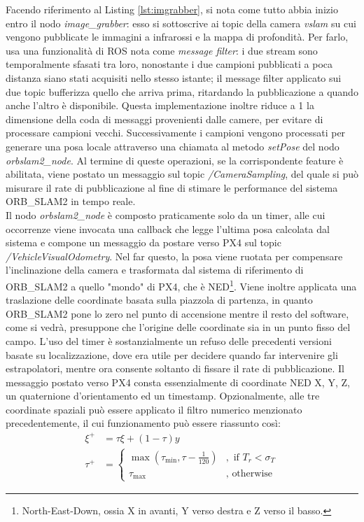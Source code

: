 Facendo riferimento al Listing \ref{lst:imgrabber}, si nota come tutto abbia inizio entro il nodo \emph{image\_grabber}: esso si sottoscrive ai topic della camera \emph{vslam} su cui vengono pubblicate le immagini a infrarossi e la mappa di profondità. Per farlo, usa una funzionalità di ROS nota come \emph{message filter}: i due stream sono temporalmente sfasati tra loro, nonostante i due campioni pubblicati a poca distanza siano stati acquisiti nello stesso istante; il message filter applicato sui due topic bufferizza quello che arriva prima, ritardando la pubblicazione a quando anche l'altro è disponibile. Questa implementazione inoltre riduce a 1 la dimensione della coda di messaggi provenienti dalle camere, per evitare di processare campioni vecchi. Successivamente i campioni vengono processati per generare una posa locale attraverso una chiamata al metodo \emph{setPose} del nodo \emph{orbslam2\_node}. Al termine di queste operazioni, se la corrispondente feature è abilitata, viene postato un messaggio sul topic \emph{/CameraSampling}, del quale si può misurare il rate di pubblicazione al fine di stimare le performance del sistema ORB\_SLAM2 in tempo reale.\\
Il nodo \emph{orbslam2\_node} è composto praticamente solo da un timer, alle cui occorrenze viene invocata una callback che legge l'ultima posa calcolata dal sistema e compone un messaggio da postare verso PX4 sul topic \emph{/VehicleVisualOdometry}. Nel far questo, la posa viene ruotata per compensare l'inclinazione della camera e trasformata dal sistema di riferimento di ORB\_SLAM2 a quello "mondo" di PX4, che è NED\footnote{North-East-Down, ossia X in avanti, Y verso destra e Z verso il basso.}. Viene inoltre applicata una traslazione delle coordinate basata sulla piazzola di partenza, in quanto ORB\_SLAM2 pone lo zero nel punto di accensione mentre il resto del software, come si vedrà, presuppone che l'origine delle coordinate sia in un punto fisso del campo. L'uso del timer è sostanzialmente un refuso delle precedenti versioni basate su localizzazione, dove era utile per decidere quando far intervenire gli estrapolatori, mentre ora consente soltanto di fissare il rate di pubblicazione. Il messaggio postato verso PX4 consta essenzialmente di coordinate NED X, Y, Z, un quaternione d'orientamento ed un timestamp. Opzionalmente, alle tre coordinate spaziali può essere applicato il filtro numerico menzionato precedentemente, il cui funzionamento può essere riassunto così:
\begin{subequations}
    \begin{align}
        \xi^+ &= \tau\xi + (1 - \tau)y\\
        \tau^+ &=
        \begin{cases}
            \max(\tau_{\min}, \tau - \frac{1}{120}) &, \text{ if  $T_r<\sigma_T$}\\
            \tau_{\max} &, \text{ otherwise}
        \end{cases}
    \end{align}
\end{subequations}
